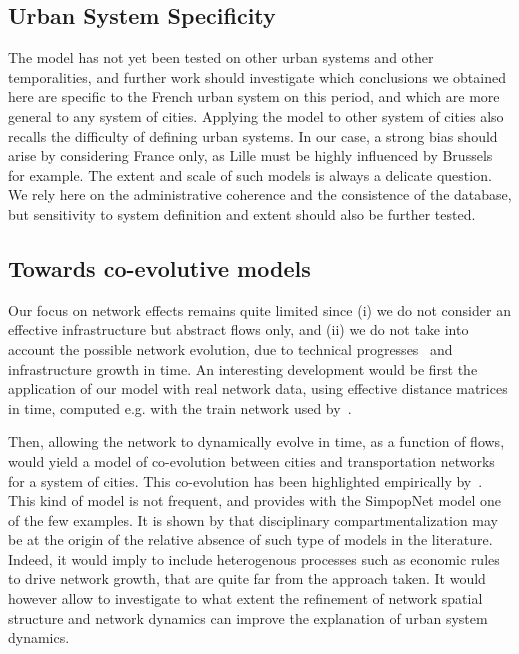 \documentclass[Royal,sageh,times]{sagej}
\begin{document}
\subsection*{Urban System Specificity}


The model has not yet been tested on other urban systems and other temporalities, and further work should investigate which conclusions we obtained here are specific to the French urban system on this period, and which are more general to any system of cities. Applying the model to other system of cities also recalls the difficulty of defining urban systems. In our case, a strong bias should arise by considering France only, as Lille must be highly influenced by Brussels for example. The extent and scale of such models is always a delicate question. We rely here on the administrative coherence and the consistence of the database, but sensitivity to system definition and extent should also be further tested.



\subsection*{Towards co-evolutive models}

Our focus on network effects remains quite limited since (i) we do not consider an effective infrastructure but abstract flows only, and (ii) we do not take into account the possible network evolution, due to technical progresses~\citep{bretagnolle2000long} and infrastructure growth in time. An interesting development would be first the application of our model with real network data, using effective distance matrices in time, computed e.g. with the train network used by~\cite{thevenin2013mapping}.

Then, allowing the network to dynamically evolve in time, as a function of flows, would yield a model of co-evolution between cities and transportation networks for a system of cities. This co-evolution has been highlighted empirically by~\cite{bretagnolle:tel-00459720}. This kind of model is not frequent, and \cite{schmitt2014modelisation} provides with the SimpopNet model one of the few examples. It is shown by \cite{raimbault2016models} that disciplinary compartmentalization may be at the origin of the relative absence of such type of models in the literature. Indeed, it would imply to include heterogenous processes such as economic rules to drive network growth, that are quite far from the approach taken. It would however allow to investigate to what extent the refinement of network spatial structure and network dynamics can improve the explanation of urban system dynamics.
\end{document}
